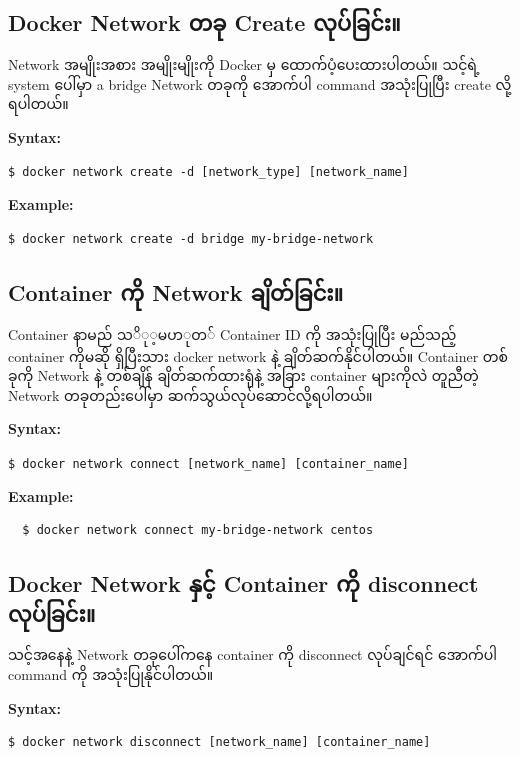 \documentclass{article}
\begin{document}
\subsection{Docker Network တခု Create
လုပ်ခြင်း။}\label{docker-network--create-}

Network အမျိုးအစား အမျိုးမျိုးကို Docker မှ ထောက်ပံ့ပေးထားပါတယ်။ သင့်ရဲ့
system ပေါ်မှာ a bridge Network တခုကို အောက်ပါ command အသုံးပြုပြီး
create လို့ရပါတယ်။

\textbf{Syntax:}

\begin{verbatim}
$ docker network create -d [network_type] [network_name]
\end{verbatim}

\textbf{Example:}

\begin{verbatim}
$ docker network create -d bridge my-bridge-network
\end{verbatim}

\subsection{Container ကို Network
ချိတ်ခြင်း။}\label{container--network-}

Container နာမည် $သို့မဟုတ်$ Container ID ကို အသုံးပြုပြီး မည်သည့်
container ကိုမဆို ရှိပြီးသား docker network နဲ့ ချိတ်ဆက်နိုင်ပါတယ်။
Container တစ်ခုကို Network နဲ့ တစ်ချိန် ချိတ်ဆက်ထားရုံနဲ့ အခြား
container များကိုလဲ တူညီတဲ့ Network တခုတည်းပေါ်မှာ
ဆက်သွယ်လုပ်ဆောင်လို့ရပါတယ်။

\textbf{Syntax:}

\texttt{\$ docker network connect {[}network\_name{]} {[}container\_name{]}}

\textbf{Example:}

\begin{verbatim}
  $ docker network connect my-bridge-network centos
\end{verbatim}

\subsection{Docker Network နှင့် Container ကို disconnect
လုပ်ခြင်း။}\label{docker-network--container--disconnect-}

သင့်အနေနဲ့ Network တခုပေါ်ကနေ container ကို disconnect လုပ်ချင်ရင်
အောက်ပါ command ကို အသုံးပြုနိုင်ပါတယ်။

\textbf{Syntax:}

\begin{verbatim}
$ docker network disconnect [network_name] [container_name]
\end{verbatim}
\end{document}
